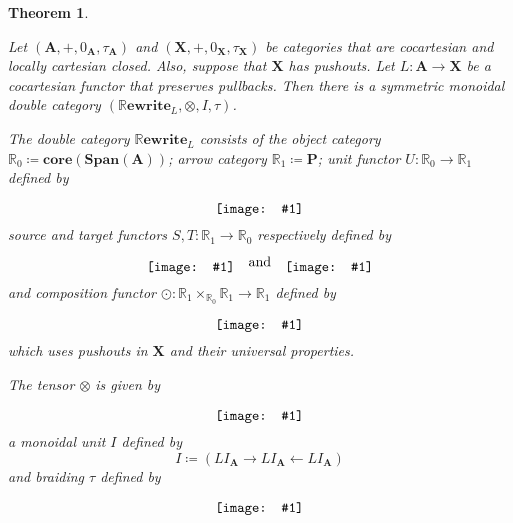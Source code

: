 \documentclass[]{amsart}
\newcommand{\RR}{\mathbb{R}}
\newcommand{\A}{\cat{A}}
\renewcommand{\P}{\cat{P}}
\newcommand{\X}{\cat{X}}
\newcommand{\core}{\mathbf{core}}
\newcommand{\cat}[1]{\mathbf{#1}}
\newcommand{\from}{\colon}
\newcommand{\diagram}[1]{\raisebox{-0.5\height}{\texttt{[image: \#1]}}}
\newcommand{\Span}{\mathbf{Span}}
\newcommand{\RRewrite}{ \mathbb{R}\mathbf{ewrite} }
\newtheorem{theorem}{Theorem}[section]
\theoremstyle{remark}
\theoremstyle{definition}
\begin{document}
\begin{theorem} \label{thm:dbl-rewr-smc}

  Let $ (\A , + , 0_\A , \tau_\A ) $ and
  $ (\X , + , 0_\X , \tau_\X ) $ be categories that are cocartesian
  and locally cartesian closed. Also, suppose that $ \X $ has
  pushouts. Let $ L \from \A \to \X $ be a cocartesian functor that
  preserves pullbacks. Then there is a symmetric monoidal double
  category $ ( \RRewrite_{L} , \otimes , I, \tau ) $.

  The double category $ \RRewrite_{L} $ consists of the object
  category $ \RR_0 \coloneqq \core ( \Span (\A) ) $; arrow category
  $ \RR_1 \coloneqq \P $; unit functor $ U \from \RR_0 \to \RR_1 $
  defined by
  \[
    \diagram{diag_nlr_dbl-rewrite-unit-functor}
  \]
  source and target functors $ S , T \from \RR_1 \to \RR_0 $
  respectively defined by
  \[
    \diagram{diag_nlr_dbl-rewrite-source-functor} \quad \text{and}
    \quad \diagram{diag_nlr_dbl-rewrite-target-functor}
  \]
  and composition functor
  $ \odot \from \RR_1 \times_{\RR_0} \RR_1 \to \RR_1 $ defined by
  \[
    \diagram{diag_nlr_dbl-rewrite-composition-functor}
  \]
  which uses pushouts in $ \X $ and their universal properties.
	 
  The tensor $ \otimes $ is given by
  \[ \diagram{diag_nlr_dbl-rewrite-tensor} \]
  a monoidal unit $ I $ defined by
  \[
    I \coloneqq ( L I_{\A} \to L I_{\A} \gets L I_{\A} )
  \]
  and braiding $ \tau $ defined by
  \[
    \diagram{diag_nlr_dbl-rewrite-braiding}
  \]
         
\end{theorem}
\end{document}

